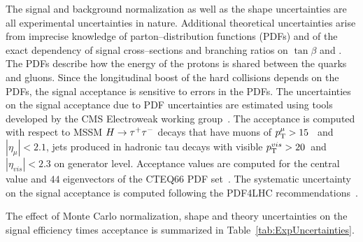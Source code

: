 The signal and background normalization as well as the shape uncertainties are
all experimental uncertainties in nature.  Additional theoretical uncertainties
arise from imprecise knowledge of parton--distribution functions (PDFs) and of
the exact dependency of signal cross--sections and branching ratios on
$\tan\beta$ and \ma.  The PDFs describe how the energy of the protons is shared
between the quarks and gluons.  Since the longitudinal boost of the hard
collisions depends on the PDFs, the signal acceptance is sensitive to errors in
the PDFs.  The uncertainties on the signal acceptance due to PDF uncertainties
are estimated using tools developed by the CMS Electroweak working
group~\cite{CMS_EWK_pdfUncertaintyTools}.  The acceptance is computed with
respect to MSSM $H \to \tau^+\tau^-$ decays that have muons of $p_{\mathrm{T}}^{\mu} > 15$~\GeVc
and $\left| \eta_{\mu} \right| < 2.1$, jets produced in hadronic tau decays with
visible $p_{\mathrm{T}}^{vis} > 20$~\GeVc and $\left| \eta_{vis} \right| < 2.3$ on
generator level.  Acceptance values are computed for the central value and $44$
eigenvectors of the CTEQ66 PDF set~\cite{CTEQpdfSet}.  The systematic
uncertainty on the signal acceptance is computed following the PDF4LHC
recommendations~\cite{pdfAccSys01,pdfAccSys02}.

The effect of Monte Carlo normalization, shape and theory uncertainties on the
signal efficiency times acceptance is summarized in
Table~\ref{tab:ExpUncertainties}.

